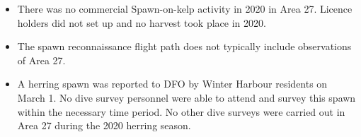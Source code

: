 \begin{itemize}

\item There was no commercial Spawn-on-kelp activity in 2020 in Area 27.
Licence holders did not set up and no harvest took place in 2020.

\item The spawn reconnaissance flight path does not typically include observations of Area 27.

\item A herring spawn was reported to DFO by Winter Harbour residents on March 1.
No dive survey personnel were able to attend and survey this spawn within the necessary time period.
No other dive surveys were carried out in Area 27 during the 2020 herring season.

\end{itemize}